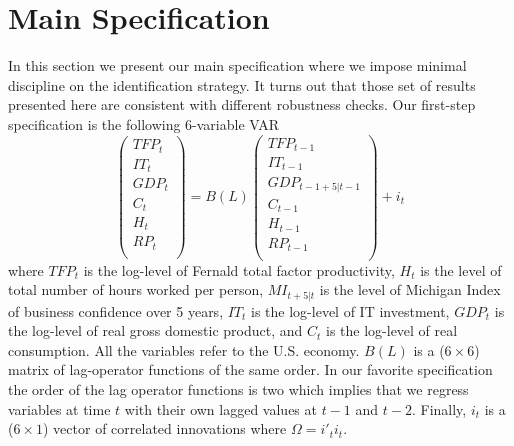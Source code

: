 \documentclass[12pt]{article}
\begin{document}
\section{Main Specification}

In this section we present our main specification where we impose minimal discipline on the identification strategy. It turns out that those set of results presented here are consistent with different robustness checks. Our first-step specification is the following 6-variable VAR 
\begin{equation}
\begin{pmatrix}
TFP_t \\ 
IT_t \\
GDP_t \\
C_t \\
H_t \\
RP_t \\
\end{pmatrix} = B(L) \begin{pmatrix}
TFP_{t-1} \\ 
IT_{t-1} \\
GDP_{t-1+5|t-1} \\
C_{t-1} \\
H_{t-1} \\
RP_{t-1} \\
\end{pmatrix} + i_t
\end{equation}
where $TFP_t$ is the log-level of Fernald total factor productivity, $H_{t}$ is the level of total number of hours worked per person, $MI_{t+5|t}$ is the level of Michigan Index of business confidence over 5 years, $IT_t$ is the log-level of IT investment, $GDP_t$ is the log-level of real gross domestic product, and $C_t$ is the log-level of real consumption. All the variables refer to the U.S. economy. $B(L)$ is a ($6\times 6$) matrix of lag-operator functions of the same order. In our favorite specification the order of the lag operator functions is two which implies that we regress variables at time $t$ with their own lagged values at $t-1$ and $t-2$. Finally, $i_t$ is a ($6\times 1$) vector of correlated innovations where $\Omega = i'_t i_t$.
\end{document}
